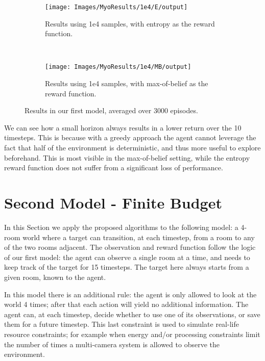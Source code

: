 \begin{figure}[ht!]
        \centering
        \begin{subfigure}[t]{0.45\textwidth}
                \texttt{[image: Images/MyoResults/1e4/E/output]}
                \caption{Results using 1e4 samples, with entropy as the reward function.}
                \label{fig:m4e}
        \end{subfigure}%
        ~ %
        \begin{subfigure}[t]{0.45\textwidth}
                \texttt{[image: Images/MyoResults/1e4/MB/output]}
                \caption{Results using 1e4 samples, with max-of-belief as the reward function.}
                \label{fig:m5e}
        \end{subfigure}
        \caption{Results in our first model, averaged over 3000 episodes.}
        \label{ref:myoentropyfig}
\end{figure}

We can see how a small horizon always results in a lower return over the 10 timesteps. This is
because with a greedy approach the agent cannot leverage the fact that half of the environment is
deterministic, and thus more useful to explore beforehand. This is most visible in the max-of-belief
setting, while the entropy reward function does not suffer from a significant loss of performance.

\section{Second Model - Finite Budget}

In this Section we apply the proposed algorithms to the following model: a 4-room world where a
target can transition, at each timestep, from a room to any of the two rooms adjacent. The
observation and reward function follow the logic of our first model: the agent can observe a single
room at a time, and needs to keep track of the target for 15 timesteps. The target here always
starts from a given room, known to the agent.

In this model there is an additional rule: the agent is only allowed to look at the world 4 times;
after that each action will yield no additional information. The agent can, at each timestep, decide
whether to use one of its observations, or save them for a future timestep. This last constraint is
used to simulate real-life resource constraints; for example when energy and/or processing
constraints limit the number of times a multi-camera system is allowed to observe the environment.

